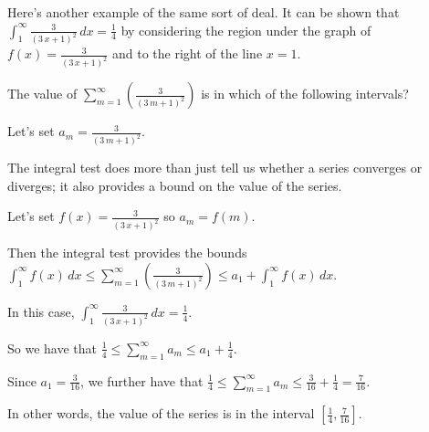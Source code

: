 \documentclass{ximera}
\begin{document}
\begin{question}
  Here's another example of the same sort of deal.  It can be shown that \(\displaystyle\int_{1}^\infty \displaystyle\frac{3}{ {\left(3 \, x + 1\right)}^{2} } \, dx = \displaystyle\frac{1}{4}\) by considering the region under the graph of \(\displaystyle f(x) = \displaystyle\frac{3}{ {\left(3 \, x + 1\right)}^{2} }\) and to the right of the line \(x = 1\).

  The value of \(\displaystyle\sum_{m=1}^\infty \left( \displaystyle\frac{3}{ {\left(3 \, m + 1\right)}^{2} } \right)\) is in which of the following intervals?

  \begin{solution}
    \begin{hint}
      Let's set \(a_m = \displaystyle\frac{3}{ {\left(3 \, m + 1\right)}^{2} }\).
    \end{hint}
    \begin{hint}
      The integral test does more than just tell us whether a series converges or diverges; it also provides a bound on the value of the series.
    \end{hint}
    \begin{hint}
      Let's set \(f(x) = \displaystyle\frac{3}{ {\left(3 \, x + 1\right)}^{2} }\) so \(a_m = f(m)\).
    \end{hint}
    \begin{hint}
      Then the integral test provides the bounds \(\displaystyle\int_{1}^\infty f(x) \, dx \leq \displaystyle\sum_{m=1}^\infty \left( \displaystyle\frac{3}{ {\left(3 \, m + 1\right)}^{2} } \right) \leq a_{1} + \displaystyle\int_{1}^\infty f(x) \, dx\).
    \end{hint}
    \begin{hint}
      In this case, \(\displaystyle\int_{1}^\infty \displaystyle\frac{3}{ {\left(3 \, x + 1\right)}^{2} } \, dx = \displaystyle\frac{1}{4}\).
    \end{hint}
    \begin{hint}
      So we have that \(\displaystyle\frac{1}{4} \leq \displaystyle\sum_{m=1}^\infty a_{m} \leq a_{1} + \displaystyle\frac{1}{4}\).
    \end{hint}
    \begin{hint}
      Since \(a_{1} = \displaystyle\frac{3}{16}\), we further have that \(\displaystyle\frac{1}{4} \leq \displaystyle\sum_{m=1}^\infty a_{m} \leq \displaystyle\frac{3}{16} + \displaystyle\frac{1}{4} = \displaystyle\frac{7}{16}\).
    \end{hint}
    \begin{hint}
      In other words, the value of the series is in the interval \(\left[\displaystyle\frac{1}{4}, \displaystyle\frac{7}{16}\right]\).
      
    \end{hint}
    
    \begin{multiple-choice}
      \choice[correct]{[1/4, 7/16]}
      \choice{[1/16, 1/4]}
      \choice{[3/16, 1/4]}
      \choice{[7/16, 5/8]}
    \end{multiple-choice}
    
  \end{solution}
\end{question}
\end{document}
